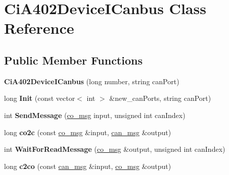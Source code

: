 \hypertarget{classCiA402DeviceICanbus}{}\section{Ci\+A402\+Device\+I\+Canbus Class Reference}
\label{classCiA402DeviceICanbus}
\subsection*{Public Member Functions}
\begin{DoxyCompactItemize}
\item 
\mbox{\label{classCiA402DeviceICanbus_a205b5105bd658b73b582cf1685f1d320}} 
{\bfseries Ci\+A402\+Device\+I\+Canbus} (long number, string can\+Port)
\item 
\mbox{\label{classCiA402DeviceICanbus_a757447054eadb6824cf779ca58d276ae}} 
long {\bfseries Init} (const vector$<$ int $>$ \&new\+\_\+can\+Ports, string can\+Port)
\item 
\mbox{\label{classCiA402DeviceICanbus_ac831e319febc65d424955e32ecdf72c3}} 
int {\bfseries Send\+Message} (\hyperlink{structco__msg}{co\+\_\+msg} input, unsigned int can\+Index)
\item 
\mbox{\label{classCiA402DeviceICanbus_aa108188c7f32a1c5d1f50662e66c6676}} 
long {\bfseries co2c} (const \hyperlink{structco__msg}{co\+\_\+msg} \&input, \hyperlink{structcan__msg}{can\+\_\+msg} \&output)
\item 
\mbox{\label{classCiA402DeviceICanbus_a1f8d07b892461470a29ac5d30f3dd679}} 
int {\bfseries Wait\+For\+Read\+Message} (\hyperlink{structco__msg}{co\+\_\+msg} \&output, unsigned int can\+Index)
\item 
\mbox{\label{classCiA402DeviceICanbus_aab504488399b2d5a5a010efef29e3d64}} 
long {\bfseries c2co} (const \hyperlink{structcan__msg}{can\+\_\+msg} \&input, \hyperlink{structco__msg}{co\+\_\+msg} \&output)
\item 
\mbox{\label{classCiA402DeviceICanbus_aa439b9175f5879282058a3f4c2edb45d}} 

\end{DoxyCompactItemize}
